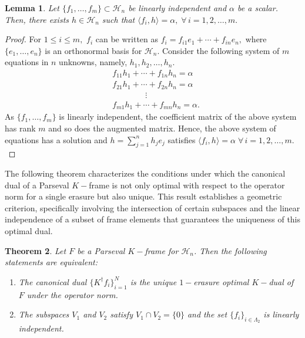 \documentclass[final,1p,times]{elsarticle}
\newtheorem{thm}{Theorem}[section]
\newtheorem{lem}[thm]{Lemma}
\begin{document}
\begin{lem}\label{lem3point6}
	Let $\{f_1,\ldots,f_m\} \subset \mathcal{H}_n$ be linearly independent and $\alpha $ be a scalar. Then, there exists $h \in \mathcal{H}_n$ such that $\langle f_i,h \rangle = \alpha, \;\forall\,i=1,2,\ldots,m.$
\end{lem}
\begin{proof}
	For $1 \leq i \leq m,$ $f_i$ can be written as $f_i = f_{i1}e_1 + \cdots + f_{in}e_n,$ where $\{e_1,\ldots,e_n\}$ is an orthonormal basis for $\mathcal{H}_n.$ Consider the following system of $m$ equations in $n$ unknowns, namely, ${h}_1,{h}_2,\ldots,{h}_n.$ 
	\begin{align*}\label{eqn7}
		&f_{11} {h}_1 + \cdots +  f_{1n} {h}_n = \alpha\\
		&f_{21} {h}_1 + \cdots + f_{2n} {h}_n= \alpha\\
		&\qquad\qquad\vdots\\
		&f_{m1} {h}_1 + \cdots + f_{mn} {h}_n = \alpha.
	\end{align*}
	As $\{f_1,\ldots,f_m\}$ is linearly independent, the coefficient matrix of the above system has rank $m$ and so does the augmented matrix. Hence, the above system of equations has a solution and $h = \sum \limits_ {j=1}^n h_j e_j$ satisfies  $\langle f_i,h \rangle = \alpha \;\forall\,i=1,2,\ldots,m.$ 
\end{proof}

The following theorem characterizes the conditions under which the canonical dual of a Parseval $K-$frame is not only optimal with respect to the operator norm for a single erasure but also unique. This result establishes a geometric criterion, specifically involving the intersection of certain subspaces and the linear independence of a subset of frame elements that guarantees the uniqueness of this optimal dual.
\begin{thm}
Let $F$ be a Parseval $K-$frame for $\mathcal{H}_n$. Then the following statements are equivalent:
\begin{enumerate}
    \item[\emph{(i)}] The canonical dual $\{K^\dag f_i\}_{i=1}^N$ is the unique $1-$erasure optimal $K-$dual of $F$ under the operator norm.
    \item[\emph{(ii)}] The subspaces $V_1$ and $V_2$ satisfy \( V_1 \cap V_2 = \{0\} \) and the set \( \{f_i\}_{i \in \Lambda_2} \) is linearly independent.
\end{enumerate}
\end{thm}
\end{document}
